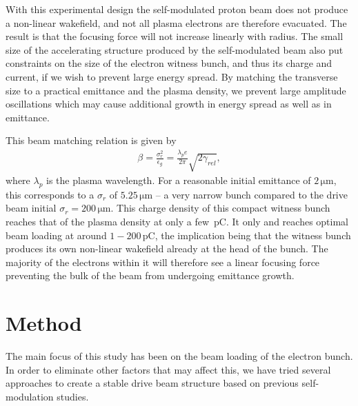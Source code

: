 \documentclass[aps,prstab,reprint,amsmath,amssymb,groupedaddress]{revtex4-1}
\newcommand{\unit}[1]{\,\mathrm{#1}}
\begin{document}
With this experimental design the self-modulated proton beam does not produce a non-linear wakefield, and not all plasma
electrons are therefore evacuated. The result is that the focusing force will not increase linearly with radius. The
small size of the accelerating structure produced by the self-modulated beam also put constraints on the size of the
electron witness bunch, and thus its charge and current, if we wish to prevent large energy spread. By matching the
transverse size to a practical emittance and the plasma density, we prevent large amplitude oscillations which may cause
additional growth in energy spread as well as in emittance.

This beam matching relation is given by
\begin{align}
    \beta = \frac{\sigma_r^2}{\epsilon_g} = \frac{\lambda_pe}{2\pi}\sqrt{2\gamma_{rel}}, \label{EQ:Matched}
\end{align}
where $\lambda_{p}$ is the plasma wavelength. For a reasonable initial emittance of $2\unit{\mu m}$, this corresponds to
a $\sigma_{r}$ of $5.25\unit{\mu m}$ -- a very narrow bunch compared to the drive beam initial
$\sigma_{r} = 200\unit{\mu m}$. This charge density of this compact witness bunch reaches that of the plasma density at
only a few $\unit{pC}$. It only and reaches optimal beam loading at around $1-200\unit{pC}$, the implication being that
the witness bunch produces its own non-linear wakefield already at the head of the bunch. The majority of the electrons
within it will therefore see a linear focusing force preventing the bulk of the beam from undergoing emittance growth.

\section[\label{S:M}]{Method}

The main focus of this study has been on the beam loading of the electron bunch. In order to eliminate other factors
that may affect this, we have tried several approaches to create a stable drive beam structure based on previous self-
modulation studies.
\end{document}
